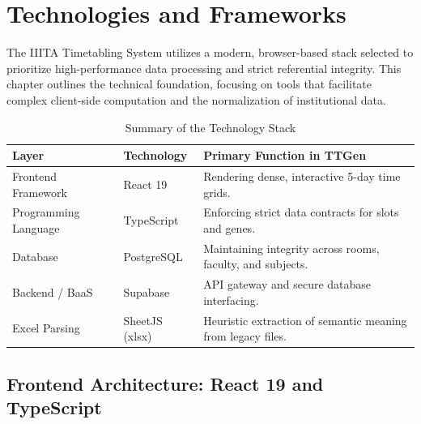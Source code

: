 \chapter{Technologies and Frameworks} %
\label{Chapter3}


The IIITA Timetabling System utilizes a modern, browser-based stack selected to prioritize high-performance data processing and strict referential integrity. This chapter outlines the technical foundation, focusing on tools that facilitate complex client-side computation and the normalization of institutional data.

\begin{table}[htbp]
\centering
\caption{Summary of the Technology Stack}
\label{tab:tech_stack}
\renewcommand{\arraystretch}{1.3}
\begin{tabularx}{\textwidth}{@{} l l X @{}}
\toprule
\textbf{Layer} & \textbf{Technology} & \textbf{Primary Function in TTGen} \\
\midrule
Frontend Framework & React 19 & Rendering dense, interactive 5-day time grids. \\
Programming Language & TypeScript & Enforcing strict data contracts for slots and genes. \\
Database & PostgreSQL & Maintaining integrity across rooms, faculty, and subjects. \\
Backend / BaaS & Supabase & API gateway and secure database interfacing. \\
Excel Parsing & SheetJS (xlsx) & Heuristic extraction of semantic meaning from legacy files. \\
\bottomrule
\end{tabularx}
\end{table}

\section{Frontend Architecture: React 19 and TypeScript}

